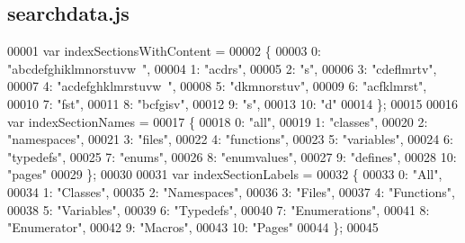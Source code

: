 \subsection{searchdata.\+js}
\label{searchdata_8js_source}

\begin{DoxyCode}
00001 var indexSectionsWithContent =
00002 \{
00003   0: \textcolor{stringliteral}{"abcdefghiklmnorstuvw~"},
00004   1: \textcolor{stringliteral}{"acdrs"},
00005   2: \textcolor{stringliteral}{"s"},
00006   3: \textcolor{stringliteral}{"cdeflmrtv"},
00007   4: \textcolor{stringliteral}{"acdefghklmrstuvw~"},
00008   5: \textcolor{stringliteral}{"dkmnorstuv"},
00009   6: \textcolor{stringliteral}{"acfklmrst"},
00010   7: \textcolor{stringliteral}{"fst"},
00011   8: \textcolor{stringliteral}{"bcfgisv"},
00012   9: \textcolor{stringliteral}{"s"},
00013   10: \textcolor{stringliteral}{"d"}
00014 \};
00015 
00016 var indexSectionNames =
00017 \{
00018   0: \textcolor{stringliteral}{"all"},
00019   1: \textcolor{stringliteral}{"classes"},
00020   2: \textcolor{stringliteral}{"namespaces"},
00021   3: \textcolor{stringliteral}{"files"},
00022   4: \textcolor{stringliteral}{"functions"},
00023   5: \textcolor{stringliteral}{"variables"},
00024   6: \textcolor{stringliteral}{"typedefs"},
00025   7: \textcolor{stringliteral}{"enums"},
00026   8: \textcolor{stringliteral}{"enumvalues"},
00027   9: \textcolor{stringliteral}{"defines"},
00028   10: \textcolor{stringliteral}{"pages"}
00029 \};
00030 
00031 var indexSectionLabels =
00032 \{
00033   0: \textcolor{stringliteral}{"All"},
00034   1: \textcolor{stringliteral}{"Classes"},
00035   2: \textcolor{stringliteral}{"Namespaces"},
00036   3: \textcolor{stringliteral}{"Files"},
00037   4: \textcolor{stringliteral}{"Functions"},
00038   5: \textcolor{stringliteral}{"Variables"},
00039   6: \textcolor{stringliteral}{"Typedefs"},
00040   7: \textcolor{stringliteral}{"Enumerations"},
00041   8: \textcolor{stringliteral}{"Enumerator"},
00042   9: \textcolor{stringliteral}{"Macros"},
00043   10: \textcolor{stringliteral}{"Pages"}
00044 \};
00045 
\end{DoxyCode}
